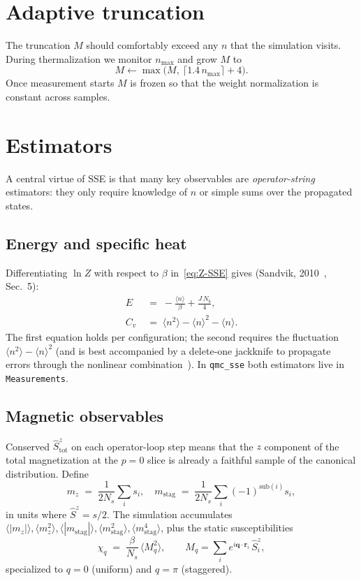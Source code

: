 \documentclass[11pt,a4paper]{article}
\newcommand{\Sz}{\hat S^z}
\newcommand{\Nb}{N_{b}}
\newcommand{\Ns}{N_{s}}
\newcommand{\stagm}{m_{\text{stag}}}
\theoremstyle{definition}
\theoremstyle{plain}
\begin{document}
\section{Adaptive truncation}\label{sec:adaptive}
The truncation $M$ should comfortably exceed any $n$ that the
simulation visits. During thermalization we monitor $n_{\max}$ and
grow $M$ to
\begin{equation}\label{eq:Mgrow}
    M \leftarrow \max\!\bigl(M,\ \lceil 1.4\,n_{\max}\rceil + 4\bigr).
\end{equation}
Once measurement starts $M$ is frozen so that the weight
normalization is constant across samples.

\section{Estimators}\label{sec:estimators}
A central virtue of SSE is that many key observables are
\emph{operator-string} estimators: they only require knowledge of
$n$ or simple sums over the propagated states.

\subsection{Energy and specific heat}
Differentiating $\ln Z$ with respect to $\beta$ in~\cref{eq:Z-SSE}
gives (Sandvik, 2010~\cite{sandvik2010}, Sec.~5):
\begin{align}
    E &\;=\; -\frac{\langle n\rangle}{\beta} + \frac{J\,\Nb}{4},
        \label{eq:E}\\[3pt]
    C_v &\;=\; \langle n^2\rangle - \langle n\rangle^2 - \langle n\rangle.
        \label{eq:Cv}
\end{align}
The first equation holds per configuration; the second requires the
fluctuation $\langle n^2\rangle - \langle n\rangle^2$ (and is best
accompanied by a delete-one jackknife to propagate errors through the
nonlinear combination~\cite{flyvbjerg1989}). In \texttt{qmc\_sse}
both estimators live in \lstinline|Measurements|.

\subsection{Magnetic observables}
Conserved $\Sz_{\text{tot}}$ on each operator-loop step means that
the $z$ component of the total magnetization at the $p=0$ slice is
already a faithful sample of the canonical distribution. Define
\begin{equation}
    m_z \;=\; \frac{1}{2\Ns}\!\sum_i s_i,
    \quad
    \stagm \;=\; \frac{1}{2\Ns}\!\sum_i (-1)^{\text{sub}(i)} s_i,
\end{equation}
in units where $\Sz=s/2$. The simulation accumulates
$\langle |m_z|\rangle, \langle m_z^2\rangle,
 \langle |\stagm|\rangle, \langle \stagm^2\rangle, \langle \stagm^4\rangle$,
plus the static susceptibilities
\begin{equation}\label{eq:chi}
    \chi_q \;=\; \frac{\beta}{\Ns}\,\langle M_q^2\rangle,
    \qquad M_q = \sum_i e^{i\mathbf q\cdot\mathbf r_i}\,\Sz_i,
\end{equation}
specialized to $q=0$ (uniform) and $q=\pi$ (staggered).
\end{document}
